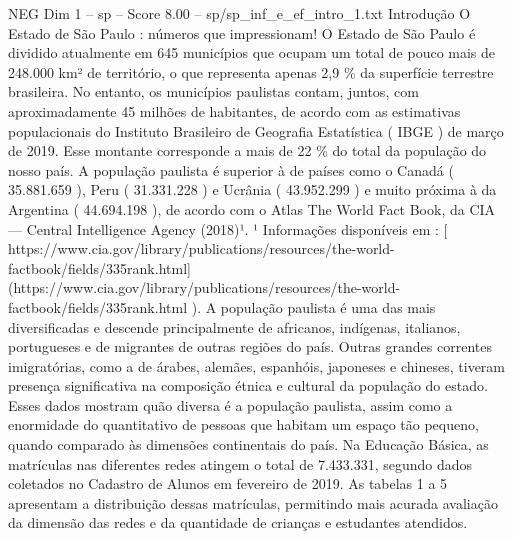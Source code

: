 \begin{textsample}{NEG Dim 1 – sp – Score 8.00 – sp/sp\_inf\_e\_ef\_intro\_1.txt}  \label{ex:f1_neg_177}
Introdução O Estado de São Paulo : números que impressionam!
O Estado de São Paulo é dividido atualmente em 645 municípios que ocupam um total de pouco mais de 248.000 km² de território, o que representa apenas 2,9 \% da superfície terrestre brasileira.
No entanto, os municípios paulistas contam, juntos, com aproximadamente 45 milhões de habitantes, de acordo com as estimativas populacionais do Instituto Brasileiro de Geografia Estatística ( IBGE ) de março de 2019.
Esse montante corresponde a mais de 22 \% do total da população do nosso país.
A população paulista é superior à de países como o Canadá ( 35.881.659 ), Peru ( 31.331.228 ) e Ucrânia ( 43.952.299 ) e muito próxima à da Argentina ( 44.694.198 ), de acordo com o Atlas The World Fact Book, da CIA — Central Intelligence Agency (2018)¹. ¹ Informações disponíveis em : [ https://www.cia.gov/library/publications/resources/the-world-factbook/fields/335rank.html](https://www.cia.gov/library/publications/resources/the-world-factbook/fields/335rank.html ).
A população paulista é uma das mais diversificadas e descende principalmente de africanos, indígenas, italianos, portugueses e de migrantes de outras regiões do país.
Outras grandes correntes imigratórias, como a de árabes, alemães, espanhóis, japoneses e chineses, tiveram presença significativa na composição étnica e cultural da população do estado.
Esses dados mostram quão diversa é a população paulista, assim como a enormidade do quantitativo de pessoas que habitam um espaço tão pequeno, quando comparado às dimensões continentais do país.
Na Educação Básica, as matrículas nas diferentes redes atingem o total de 7.433.331, segundo dados coletados no Cadastro de Alunos em fevereiro de 2019.
As tabelas 1 a 5 apresentam a distribuição dessas matrículas, permitindo mais acurada avaliação da dimensão das redes e da quantidade de crianças e estudantes atendidos.

\end{textsample}
